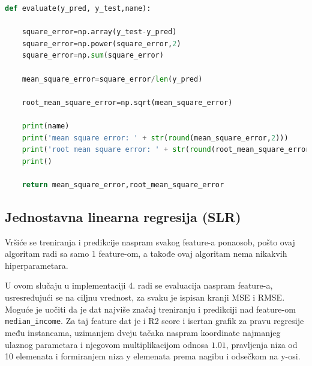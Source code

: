 \documentclass[fontsize=12bp, paper=a4]{scrarticle}
\begin{document}
\begin{lstlisting}[language=Python, caption=Postupak ispisa evaluacije (korena) središnje kvadratne greške]
def evaluate(y_pred, y_test,name):

    square_error=np.array(y_test-y_pred)
    square_error=np.power(square_error,2)
    square_error=np.sum(square_error)

    mean_square_error=square_error/len(y_pred)

    root_mean_square_error=np.sqrt(mean_square_error)

    print(name)
    print('mean square error: ' + str(round(mean_square_error,2)))
    print('root mean square error: ' + str(round(root_mean_square_error,2)))
    print()

    return mean_square_error,root_mean_square_error

\end{lstlisting}

\subsection{Jednostavna linearna regresija (SLR)}

Vršiće se treniranja i predikcije naspram svakog feature-a ponaosob, pošto ovaj algoritam\cite{LR} radi sa samo 1 feature-om, a takođe ovaj algoritam nema nikakvih hiperparametara.

U ovom slučaju u implementaciji 4. radi se evaluacija naspram feature-a, usresređujući se na ciljnu vrednost, za svaku je ispisan kranji MSE i RMSE. Moguće je uočiti da je dat najviše značaj treniranju i predikciji nad feature-om \texttt{median\_income}. Za taj feature dat je i R2 score i iscrtan grafik za pravu regresije među instancama, uzimanjem dveju tačaka naspram koordinate najmanjeg ulaznog parametara i njegovom multiplikacijom odnosa $1.01$, pravljenja niza od 10 elemenata i formiranjem niza y elemenata prema nagibu i odsečkom na y-osi.
\end{document}
